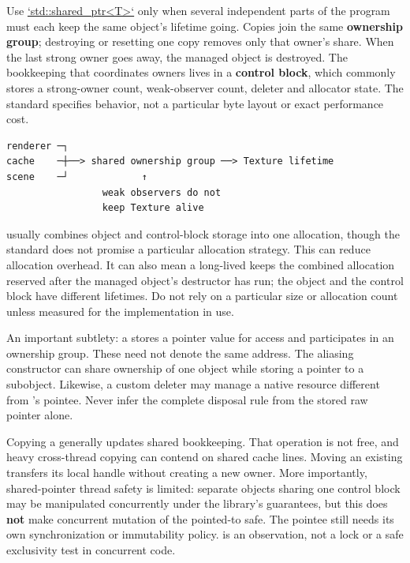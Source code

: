 \hypertarget{01-foundations-i-ch004-shared-ownership-one-object-a-group-of-owners-and-a-separate-control-block}{}

Use \hyperref[appendix-51602cabe815]{`std::shared\_ptr\textless T\textgreater`} only when several independent parts of the program must each keep the same object's lifetime going. Copies join the same \textbf{ownership group}; destroying or resetting one copy removes only that owner's share. When the last strong owner goes away, the managed object is destroyed. The bookkeeping that coordinates owners lives in a \textbf{control block}, which commonly stores a strong-owner count, weak-observer count, deleter and allocator state. The standard specifies behavior, not a particular byte layout or exact performance cost.

\begin{verbatim}
renderer ─┐
cache    ─┼──> shared ownership group ──> Texture lifetime
scene    ─┘             ↑
                 weak observers do not
                 keep Texture alive
\end{verbatim}

 usually combines object and control-block storage into one allocation, though the standard does not promise a particular allocation strategy. This can reduce allocation overhead. It can also mean a long-lived  keeps the combined allocation reserved after the managed object's destructor has run; the object and the control block have different lifetimes. Do not rely on a particular size or allocation count unless measured for the implementation in use.

An important subtlety: a  stores a pointer value for access and participates in an ownership group. These need not denote the same address. The aliasing constructor can share ownership of one object while storing a pointer to a subobject. Likewise, a custom deleter may manage a native resource different from 's pointee. Never infer the complete disposal rule from the stored raw pointer alone.

Copying a  generally updates shared bookkeeping. That operation is not free, and heavy cross-thread copying can contend on shared cache lines. Moving an existing  transfers its local handle without creating a new owner. More importantly, shared-pointer thread safety is limited: separate  objects sharing one control block may be manipulated concurrently under the library's guarantees, but this does \textbf{not} make concurrent mutation of the pointed-to  safe. The pointee still needs its own synchronization or immutability policy.  is an observation, not a lock or a safe exclusivity test in concurrent code.

